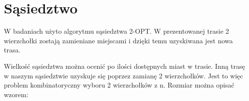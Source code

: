 \section{Sąsiedztwo}

W badaniach użyto algorytmu sąsiedztwa 2-OPT. W prezentowanej trasie 
2 wierzchołki zostają zamieniane miejscami i dzięki temu uzyskiwana jest 
nowa trasa.

Wielkość sąsiedztwa można ocenić po ilości dostępnych miast w trasie.
Inną trasę w naszym sąsiedztwie uzyskuje się poprzez zamianę 2 wierzchołków.
Jest to więc problem kombinatoryczny wyboru 2 wierzchołków z n. Rozmiar można 
opisać wzorem:

